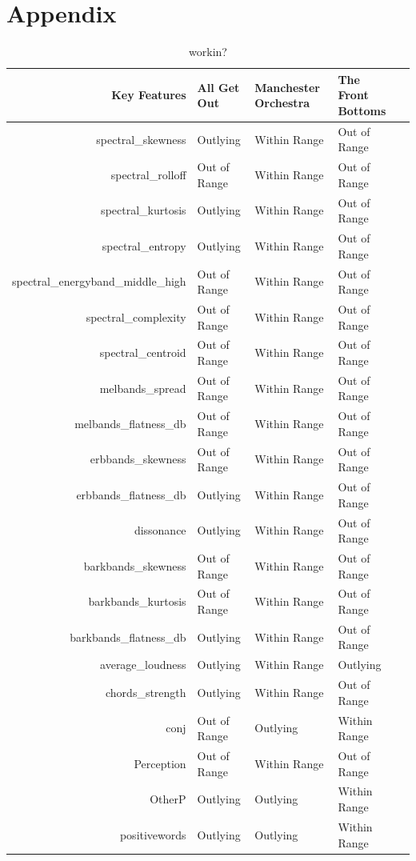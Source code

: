 \documentclass{article}\usepackage[]{graphicx}\usepackage[]{xcolor}
\begin{document}
\newpage
\onecolumn
\section{Appendix}
\begin{table}[ht]
\centering
\begin{tabular}{rllll}
  \hline
  Key Features & All Get Out & Manchester Orchestra & The Front Bottoms \\ 
  \hline
  spectral\_skewness & Outlying & Within Range & Out of Range \\ 
  spectral\_rolloff & Out of Range & Within Range & Out of Range \\ 
  spectral\_kurtosis & Outlying & Within Range & Out of Range \\ 
  spectral\_entropy & Outlying & Within Range & Out of Range \\ 
  spectral\_energyband\_middle\_high & Out of Range & Within Range & Out of Range \\ 
  spectral\_complexity & Out of Range & Within Range & Out of Range \\ 
  spectral\_centroid & Out of Range & Within Range & Out of Range \\ 
  melbands\_spread & Out of Range & Within Range & Out of Range \\ 
  melbands\_flatness\_db & Out of Range & Within Range & Out of Range \\ 
  erbbands\_skewness & Out of Range & Within Range & Out of Range \\ 
  erbbands\_flatness\_db & Outlying & Within Range & Out of Range \\ 
  dissonance & Outlying & Within Range & Out of Range \\ 
  barkbands\_skewness & Out of Range & Within Range & Out of Range \\ 
  barkbands\_kurtosis & Out of Range & Within Range & Out of Range \\ 
  barkbands\_flatness\_db & Outlying & Within Range & Out of Range \\ 
  average\_loudness & Outlying & Within Range & Outlying \\ 
  chords\_strength & Outlying & Within Range & Out of Range \\ 
  conj & Out of Range & Outlying & Within Range \\ 
  Perception & Out of Range & Within Range & Out of Range \\ 
  OtherP & Outlying & Outlying & Within Range \\ 
  positivewords & Outlying & Outlying & Within Range \\ 
   \hline
\end{tabular}
\caption{workin?}
\label{feat.table}
\end{table}
\end{document}

